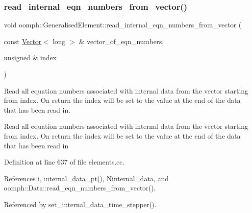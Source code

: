 \mbox{\label{classoomph_1_1GeneralisedElement_a27afd80364f84725fbcf20d69e6f98e6}} 
\subsubsection{\texorpdfstring{read\+\_\+internal\+\_\+eqn\+\_\+numbers\+\_\+from\+\_\+vector()}{read\_internal\_eqn\_numbers\_from\_vector()}}
{\footnotesize\ttfamily void oomph\+::\+Generalised\+Element\+::read\+\_\+internal\+\_\+eqn\+\_\+numbers\+\_\+from\+\_\+vector (\begin{DoxyParamCaption}\item[{const \hyperlink{classoomph_1_1Vector}{Vector}$<$ long $>$ \&}]{vector\+\_\+of\+\_\+eqn\+\_\+numbers,  }\item[{unsigned \&}]{index }\end{DoxyParamCaption})}



Read all equation numbers associated with internal data from the vector starting from index. On return the index will be set to the value at the end of the data that has been read in. 

Read all equation numbers associated with internal data from the vector starting from index. On return the index will be set to the value at the end of the data that has been read in 

Definition at line 637 of file elements.\+cc.



References i, internal\+\_\+data\+\_\+pt(), Ninternal\+\_\+data, and oomph\+::\+Data\+::read\+\_\+eqn\+\_\+numbers\+\_\+from\+\_\+vector().



Referenced by set\+\_\+internal\+\_\+data\+\_\+time\+\_\+stepper().

\mbox{\label{classoomph_1_1GeneralisedElement_a10210277ae4fa66b7701ff00d4dd9b14}} 
